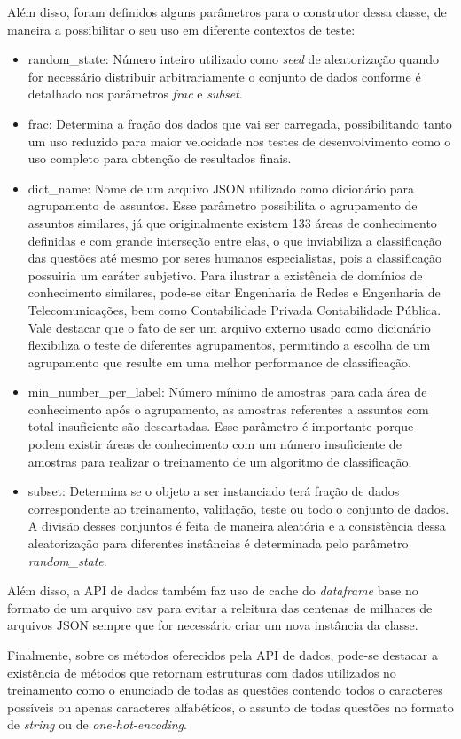 Além disso, foram definidos alguns parâmetros para o construtor dessa classe, de maneira a possibilitar o seu uso em diferente contextos de teste:

\begin{itemize}

  \item random\_state: Número inteiro utilizado como \textit{seed} de aleatorização quando for necessário distribuir arbitrariamente o conjunto de dados conforme é detalhado nos parâmetros \textit{frac} e \textit{subset}.
  
  \item frac: Determina a fração dos dados que vai ser carregada, possibilitando tanto um uso reduzido para maior velocidade nos testes de desenvolvimento como o uso completo para obtenção de resultados finais.
  
  \item dict\_name: Nome de um arquivo JSON utilizado como dicionário para agrupamento de assuntos. Esse parâmetro possibilita o agrupamento de assuntos similares, já que originalmente existem 133 áreas de conhecimento definidas e com grande interseção entre elas, o que inviabiliza a classificação das questões até mesmo por seres humanos especialistas, pois a classificação possuiria um caráter subjetivo. Para ilustrar a existência de domínios de conhecimento similares, pode-se citar Engenharia de Redes e Engenharia de Telecomunicações, bem como Contabilidade Privada Contabilidade Pública. Vale destacar que o fato de ser um arquivo externo usado como dicionário flexibiliza o teste de diferentes agrupamentos, permitindo a escolha de um agrupamento que resulte em uma melhor performance de classificação.
  
  \item min\_number\_per\_label: Número mínimo de amostras para cada área de conhecimento após o agrupamento, as amostras referentes a assuntos com total insuficiente são descartadas. Esse parâmetro é importante porque podem existir áreas de conhecimento com um número insuficiente de amostras para realizar o treinamento de um algoritmo de classificação.

  \item subset: Determina se o objeto a ser instanciado terá fração de dados correspondente ao treinamento, validação, teste ou todo o conjunto de dados. A divisão desses conjuntos é feita de maneira aleatória e a consistência dessa aleatorização para diferentes instâncias é determinada pelo parâmetro \textit{random\_state}.
  
\end{itemize}

Além disso, a API de dados também faz uso de cache do \textit{dataframe} base no formato de um arquivo csv para evitar a releitura das centenas de milhares de arquivos JSON sempre que for necessário criar um nova instância da classe.

Finalmente, sobre os métodos oferecidos pela API de dados, pode-se destacar a existência de métodos que retornam estruturas com dados utilizados no treinamento como o enunciado de todas as questões contendo todos o caracteres possíveis ou apenas caracteres alfabéticos, o assunto de todas questões no formato de \textit{string} ou de \textit{one-hot-encoding}. 